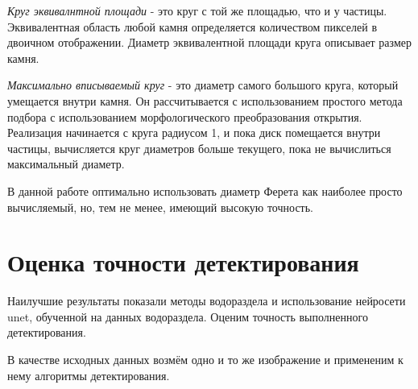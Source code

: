 \documentclass[times]{itmo-student-thesis}
\begin{document}
\textit{Круг эквивалнтной площади} - это круг с той же площадью, что и у частицы. Эквивалентная область любой камня определяется количеством пикселей в двоичном отображении. Диаметр эквивалентной площади круга описывает размер камня.

\textit{Максимально вписываемый круг} -  это диаметр самого большого круга, который умещается внутри камня. Он рассчитывается с использованием простого метода подбора с использованием морфологического преобразования открытия.  Реализация начинается с круга радиусом 1, и пока диск помещается внутри частицы, вычисляется круг диаметров больше текущего, пока не вычислиться максимальный диаметр. 

В данной работе оптимально использовать диаметр Ферета как наиболее просто вычисляемый, но, тем не менее, имеющий высокую точность.

\section{Оценка точности детектирования}
Наилучшие результаты показали методы водораздела и использование нейросети unet, обученной на данных водораздела. Оценим точность выполненного детектирования. 

В качестве исходных данных возмём одно и то же изображение и примененим к нему алгоритмы детектирования. 
\end{document}
